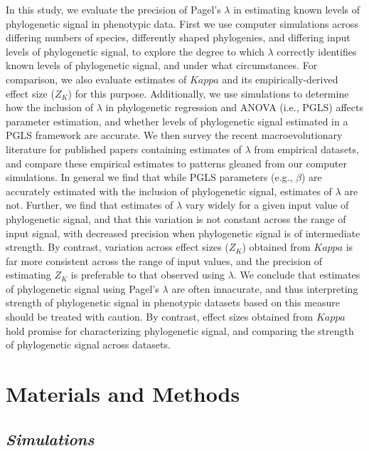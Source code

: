 \documentclass[
]{article}
\begin{document}
In this study, we evaluate the precision of Pagel's \(\lambda\) in
estimating known levels of phylogenetic signal in phenotypic data. First
we use computer simulations across differing numbers of species,
differently shaped phylogenies, and differing input levels of
phylogenetic signal, to explore the degree to which \(\lambda\)
correctly identifies known levels of phylogenetic signal, and under what
circumstances. For comparison, we also evaluate estimates of \(Kappa\)
and its empirically-derived effect size (\(Z_K\)) for this purpose.
Additionally, we use simulations to determine how the inclusion of
\(\lambda\) in phylogenetic regression and ANOVA (i.e., PGLS) affects
parameter estimation, and whether levels of phylogenetic signal
estimated in a PGLS framework are accurate. We then survey the recent
macroevolutionary literature for published papers containing estimates
of \(\lambda\) from empirical datasets, and compare these empirical
estimates to patterns gleaned from our computer simulations. In general
we find that while PGLS parameters (e.g., \(\beta\)) are accurately
estimated with the inclusion of phylogenetic signal, estimates of
\(\lambda\) are not. Further, we find that estimates of \(\lambda\) vary
widely for a given input value of phylogenetic signal, and that this
variation is not constant across the range of input signal, with
decreased precision when phylogenetic signal is of intermediate
strength. By contrast, variation across effect sizes (\(Z_K\)) obtained
from \(Kappa\) is far more consistent across the range of input values,
and the precision of estimating \(Z_K\) is preferable to that observed
using \(\lambda\). We conclude that estimates of phylogenetic signal
using Pagel's \(\lambda\) are often innacurate, and thus interpreting
strength of phylogenetic signal in phenotypic datasets based on this
measure should be treated with caution. By contrast, effect sizes
obtained from \(Kappa\) hold promise for characterizing phylogenetic
signal, and comparing the strength of phylogenetic signal across
datasets.

\hypertarget{materials-and-methods}{%
\section{Materials and Methods}\label{materials-and-methods}}

\hypertarget{simulations}{%
\subsection{\texorpdfstring{\emph{Simulations}}{Simulations}}\label{simulations}}
\end{document}
